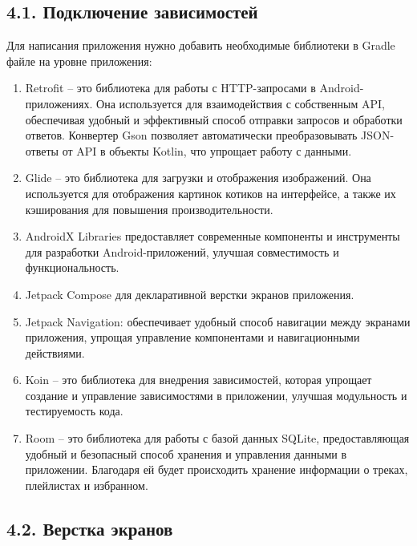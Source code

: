 \documentclass{vsureport}
\begin{document}
\subsection*{4.1. Подключение зависимостей}

Для написания приложения нужно добавить необходимые библиотеки в Gradle файле на уровне приложения: 
\begin{enumerate}
	\item Retrofit – это библиотека для работы с HTTP-запросами в Android-приложениях. Она используется для взаимодействия с собственным API, обеспечивая удобный и эффективный способ отправки запросов и обработки ответов. Конвертер Gson позволяет автоматически преобразовывать JSON-ответы от API в объекты Kotlin, что упрощает работу с данными.   \cite{ref7}\cite{ref8}
	
	\item Glide – это библиотека для загрузки и отображения изображений. Она используется для отображения картинок котиков на интерфейсе, а также их кэширования для повышения производительности. \cite{ref7}
	
	\item AndroidX Libraries предоставляет современные компоненты и инструменты для разработки Android-приложений, улучшая совместимость и функциональность. \cite{ref7}
	
	\item Jetpack Compose для декларативной верстки экранов приложения. \cite{ref7}
	
	\item Jetpack Navigation: обеспечивает удобный способ навигации между экранами приложения, упрощая управление компонентами и навигационными действиями. 
	
	\item Koin – это библиотека для внедрения зависимостей, которая упрощает создание и управление зависимостями в приложении, улучшая модульность и тестируемость кода.
	
	\item Room – это библиотека для работы с базой данных SQLite, предоставляющая удобный и безопасный способ хранения и управления данными в приложении. Благодаря ей будет происходить хранение информации о треках, плейлистах и избранном.
\end{enumerate}

\subsection*{4.2. Верстка экранов}
\end{document}
